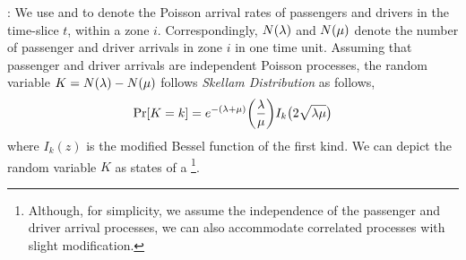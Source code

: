 :
We use {\passengerarrivalrate} and {\driverarrivalrate} to denote the Poisson arrival rates of passengers and drivers in the time-slice $t$, within a zone $i$. Correspondingly, $N(\lambda)$ and $N(\mu)$ denote the number of passenger and driver arrivals in zone $i$ in one time unit. Assuming that passenger and driver arrivals are independent Poisson processes, the random variable $K = N(\lambda) - N(\mu)$ follows \textit{Skellam Distribution} as follows,
\begin{equation}
\Pr[K=k] = e^{-(\lambda + \mu)} \bigg(\frac{\lambda}{\mu}\bigg) I_k\big(2 \sqrt{\lambda \mu}\big)
\end{equation}
where $I_k(z)$ is the modified Bessel function of the first kind. We can depict the random variable $K$ as states of a {\markovchain}\footnote{Although, for simplicity, we assume the independence of the passenger and driver arrival processes, we can also accommodate correlated processes with slight modification.}.




